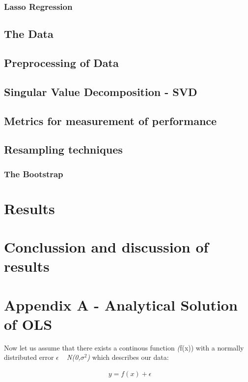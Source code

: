 \documentclass[a4paper, 10pt]{article}
\begin{document}
\subsubsection{Lasso Regression}

\subsection{The Data}

\subsection{Preprocessing of Data}

\subsection{Singular Value Decomposition - SVD}

\subsection{Metrics for measurement of performance}

\subsection{Resampling techniques}

\subsubsection{The Bootstrap}


\section{Results}

\section{Conclussion and discussion of results}


\section{Appendix A - Analytical Solution of OLS}
Now let us assume that there exists a continous function \emph(f(x)) with a normally distributed error $\epsilon$ ~ \emph{N(0,$\sigma^2$)} which describes our data: 

\begin{gather*}
	\textbf{ $y=f(x) + \epsilon$}
\end{gather*}
\end{document}

